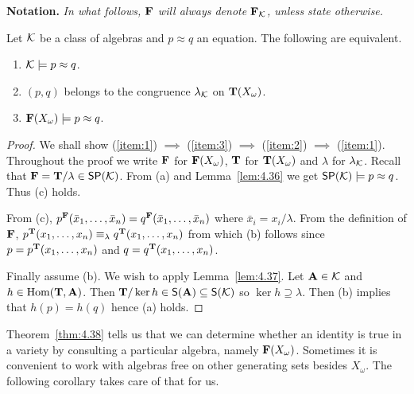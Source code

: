 \documentclass[11pt]{amsart}  %
\begin{document}
{\bf Notation.}
\emph{In what follows, $\mathbf{F}$ will always denote $\mathbf{F}_{\mathcal{K}}$, unless state otherwise.}

\begin{theorem}
  \label{thm:4.38}  
  Let $\mathcal{K}$ be a class of algebras and $p \approx q$ an equation. The 
  following are equivalent.
  \begin{enumerate}
    \item \label{item:1} $\mathcal{K} \models p\approx q$.
    \item \label{item:2} $(p,q)$ belongs to the congruence $\lambda_{\mathcal{K}}$ on $\mathbf{T}(X_\omega)$.
    \item \label{item:3} $\mathbf{F}(X_\omega) \models p\approx q$.
  \end{enumerate} 
\end{theorem}
\begin{proof} 
  We shall show 
  (\ref{item:1}) $\implies$ (\ref{item:3}) $\implies$ (\ref{item:2}) $\implies$ (\ref{item:1}).
  Throughout the proof we write $\mathbf{F}$ for $\mathbf{F}(X_\omega)$, $\mathbf{T}$ for 
  $\mathbf{T}(X_\omega)$ and $\lambda$ for $\lambda_{\mathcal{K}}$. 
  Recall that $\mathbf{F} = \mathbf{T}/\lambda \in \mathsf{S}\mathsf{P}(\mathcal{K})$. 
  From (a) and Lemma~\ref{lem:4.36} we get $\mathsf{S}\mathsf{P}(\mathcal{K}) \models p \approx q$. 
  Thus (c) holds.

  From (c), $p^{\mathbf{F}}(\bar{x}_1,\dots, \bar{x}_n) = q^{\mathbf{F}}(\bar{x}_1,\dots, \bar{x}_n)$
  where $\bar{x}_i = x_i/\lambda$. From the definition of $\mathbf{F}$, 
  $p^{\mathbf{T}}(x_1,\dots, x_n) \equiv_\lambda q^{\mathbf{T}}(x_1,\dots, x_n)$
  from which (b) follows since $p = p^{\mathbf{T}}(x_1,\dots, x_n)$ and $q = q^{\mathbf{T}}(x_1,\dots, x_n)$.

  Finally assume (b). We wish to apply Lemma~\ref{lem:4.37}. 
  Let $\mathbf{A} \in \mathcal{K}$ and $h \in \operatorname{Hom}(\mathbf{T},\mathbf{A})$. 
  Then $\mathbf{T}/\ker h \in \mathsf{S}(\mathbf{A}) \subseteq \mathsf{S}(\mathcal{K})$ so $\ker h \supseteq \lambda$. 
  Then (b) implies that $h(p) = h(q)$ hence (a) holds.
\end{proof}

Theorem~\ref{thm:4.38} tells us that we can determine whether an identity is true 
in a variety by consulting a particular algebra, namely $\mathbf{F}(X_\omega)$. 
Sometimes it is convenient to work with algebras free on other generating sets besides 
$X_\omega$. The following corollary takes care of that for us.
\end{document}
